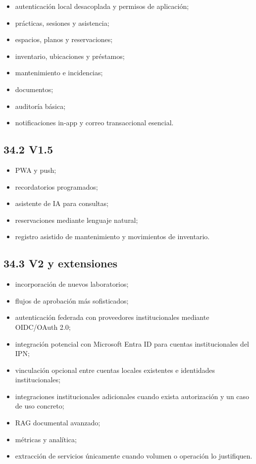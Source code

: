 \documentclass[12pt]{article}
\begin{document}
\begin{itemize}[leftmargin=1.2cm]
    \item autenticación local desacoplada y permisos de aplicación;
    \item prácticas, sesiones y asistencia;
    \item espacios, planos y reservaciones;
    \item inventario, ubicaciones y préstamos;
    \item mantenimiento e incidencias;
    \item documentos;
    \item auditoría básica;
    \item notificaciones in-app y correo transaccional esencial.
\end{itemize}

\subsection*{34.2 V1.5}

\begin{itemize}[leftmargin=1.2cm]
    \item PWA y push;
    \item recordatorios programados;
    \item asistente de IA para consultas;
    \item reservaciones mediante lenguaje natural;
    \item registro asistido de mantenimiento y movimientos de inventario.
\end{itemize}

\subsection*{34.3 V2 y extensiones}

\begin{itemize}[leftmargin=1.2cm]
    \item incorporación de nuevos laboratorios;
    \item flujos de aprobación más sofisticados;
    \item autenticación federada con proveedores institucionales mediante OIDC/OAuth 2.0;
    \item integración potencial con Microsoft Entra ID para cuentas institucionales del IPN;
    \item vinculación opcional entre cuentas locales existentes e identidades institucionales;
    \item integraciones institucionales adicionales cuando exista autorización y un caso de uso concreto;
    \item RAG documental avanzado;
    \item métricas y analítica;
    \item extracción de servicios únicamente cuando volumen o operación lo justifiquen.
\end{itemize}
\end{document}
